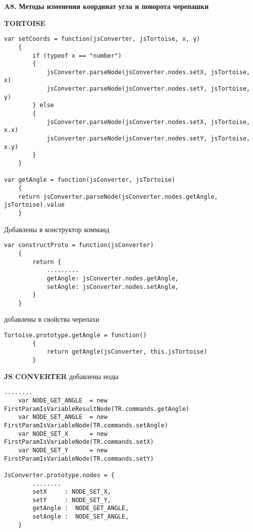 \vspace{16mm}
\textbf{\Large A8. Методы изменения координат угла и поворота черепашки}
\vspace{6mm}

\textbf{TORTOISE}
\begin{verbatim}
var setCoords = function(jsConverter, jsTortoise, x, y)
    {
        if (typeof x == "number")
        {
            jsConverter.parseNode(jsConverter.nodes.setX, jsTortoise, x)
            jsConverter.parseNode(jsConverter.nodes.setY, jsTortoise, y)
        } else 
        {
            jsConverter.parseNode(jsConverter.nodes.setX, jsTortoise, x.x)
            jsConverter.parseNode(jsConverter.nodes.setY, jsTortoise, x.y)
        }	
    }

var getAngle = function(jsConverter, jsTortoise)
    {
    return jsConverter.parseNode(jsConverter.nodes.getAngle, jsTortoise).value
    }
\end{verbatim}

Добавлены в конструктор комманд
\begin{verbatim}
var constructProto = function(jsConverter)
    {
        return {
            .........
            getAngle: jsConverter.nodes.getAngle,
            setAngle: jsConverter.nodes.setAngle,
        }
    }
\end{verbatim}



добавлены в свойства черепахи
\begin{verbatim}
Tortoise.prototype.getAngle = function()
        {
            return getAngle(jsConverter, this.jsTortoise)
        }
\end{verbatim}


\textbf{JS CONVERTER}
добавлены  ноды
\begin{verbatim}
........
    var NODE_GET_ANGLE  = new FirstParamIsVariableResultNode(TR.commands.getAngle)
    var NODE_SET_ANGLE  = new FirstParamIsVariableNode(TR.commands.setAngle)
    var NODE_SET_X      = new FirstParamIsVariableNode(TR.commands.setX)
    var NODE_SET_Y      = new FirstParamIsVariableNode(TR.commands.setY)

JsConverter.prototype.nodes = {
        ........
        setX     : NODE_SET_X,
        setY     : NODE_SET_Y,
        getAngle : 	NODE_GET_ANGLE,
        setAngle :  NODE_SET_ANGLE,
    }
\end{verbatim}


